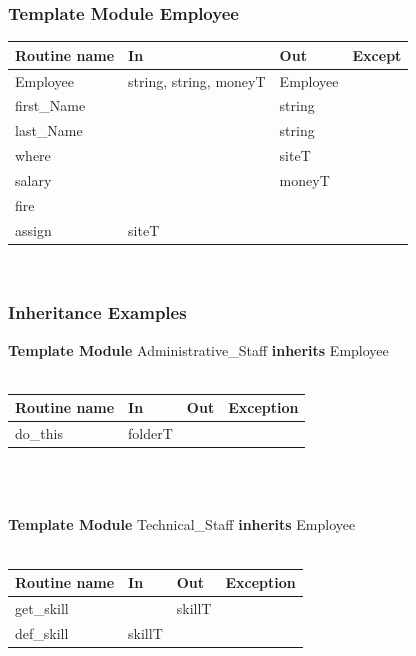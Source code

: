 \documentclass[t,12pt,numbers,fleqn]{beamer}
\begin{document}

\begin{frame}
\frametitle{Template Module Employee}

\begin{tabular}{| l | l | l | l |}
\hline
\textbf{Routine name} & \textbf{In} & \textbf{Out} & \textbf{Except}\\
\hline
Employee & string, string, moneyT & Employee & ~\\
\hline
first\_Name & ~ & string & ~\\
\hline
last\_Name & ~ & string & ~\\
\hline
where & ~ & siteT & ~\\
\hline
salary & ~ & moneyT & ~\\
\hline
fire & ~ & ~ & ~\\
\hline
assign & siteT & ~ & ~\\
\hline
\end{tabular}\\

\end{frame}


\begin{frame}
\frametitle{Inheritance Examples}

\textbf{Template Module}
Administrative\_Staff \textbf{inherits} Employee\\
~\newline

\begin{tabular}{| l | l | l | l |}
\hline
\textbf{Routine name} & \textbf{In} & \textbf{Out} & \textbf{Exception}\\
\hline
do\_this & folderT & ~ & ~\\
\hline
\end{tabular}\\
~\newline

\textbf{Template Module}
Technical\_Staff \textbf{inherits} Employee\\
~\newline

\begin{tabular}{| l | l | l | l |}
\hline
\textbf{Routine name} & \textbf{In} & \textbf{Out} & \textbf{Exception}\\
\hline
get\_skill & ~ & skillT & ~\\
\hline
def\_skill & skillT & ~ & ~\\
\hline
\end{tabular}\\

\end{frame}
\end{document}
